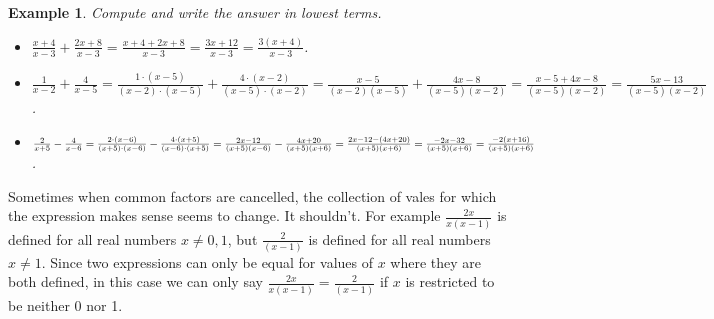 \documentclass[11pt]{book}               %
\newtheorem{example}{Example}
\begin{document}
%
%

\begin{example}
Compute and write the answer in lowest terms.
\begin{itemize}
\item $ \frac{x+4}{x-3} + \frac{2x+8}{x-3} 
    = \frac{x+4+2x+8}{x-3}
    =\frac{3x+12}{x-3}
    =\frac{3(x+4)}{x-3}$.

\item $ \frac{1}{x-2} + \frac{4}{x-5} 
    = \frac{1 \cdot (x-5)}{(x-2) \cdot (x-5)}+ \frac{4\cdot (x-2)}{(x-5) \cdot (x-2)} 
    = \frac{x-5}{(x-2) (x-5)} + \frac{4x-8}{(x-5) (x-2)}
    = \frac{x-5+4x-8}{(x-5) (x-2)}
    = \frac{5x-13}{(x-5) (x-2)}$.

\item $ \frac{2}{x+5} - \frac{4}{x-6} 
    = \frac{2 \cdot (x-6)}{(x+5) \cdot (x-6)} - \frac{4 \cdot (x+5)}{(x-6) \cdot (x+5)} 
    = \frac{2x-12}{(x+5)(x-6)} - \frac{4x+20}{(x+5)(x+6)} 
    = \frac{2x-12 - (4x+20)}{(x+5)(x+6)} 
    = \frac{-2x-32}{(x+5)(x+6)} \\
    = \frac{-2(x+16)}{(x+5)(x+6)}$.
    
\end{itemize}
\end{example}

Sometimes when common factors are cancelled, the collection of vales for which the expression makes sense seems to change. 
It shouldn't.
For example $\frac{2x}{x(x-1)}$ is defined for all real numbers $x \neq 0, 1$,
but $\frac{2}{(x-1)}$ is defined for all real numbers $x \neq 1$.  
Since two expressions can only be equal for values of $x$ where they are both defined, in this case
we can only say $\frac{2x}{x(x-1)} = \frac{2}{(x-1)}$ if $x$ is restricted to be neither 0 nor 1.
\end{document}
